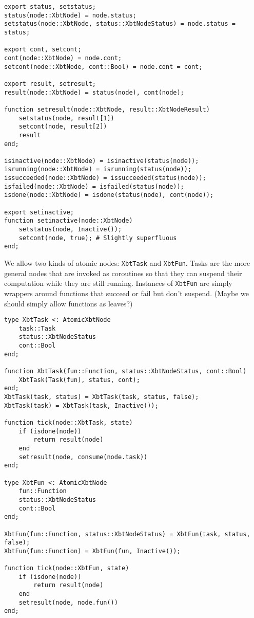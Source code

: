\documentclass[a4wide]{article}
\begin{document}
\begin{verbatim}
export status, setstatus;
status(node::XbtNode) = node.status;
setstatus(node::XbtNode, status::XbtNodeStatus) = node.status = status;

export cont, setcont;
cont(node::XbtNode) = node.cont;
setcont(node::XbtNode, cont::Bool) = node.cont = cont;

export result, setresult;
result(node::XbtNode) = status(node), cont(node);

function setresult(node::XbtNode, result::XbtNodeResult)
    setstatus(node, result[1])
    setcont(node, result[2])
    result
end;

isinactive(node::XbtNode) = isinactive(status(node));
isrunning(node::XbtNode) = isrunning(status(node));
issucceeded(node::XbtNode) = issucceeded(status(node));
isfailed(node::XbtNode) = isfailed(status(node));
isdone(node::XbtNode) = isdone(status(node), cont(node));

export setinactive;
function setinactive(node::XbtNode)
    setstatus(node, Inactive());
    setcont(node, true); # Slightly superfluous
end;
\end{verbatim}

We allow two kinds of atomic nodes: \verb~XbtTask~ and \verb~XbtFun~.  Tasks
are the more general nodes that are invoked as coroutines so that
they can suspend their computation while they are still running.
Instances of \verb~XbtFun~ are simply wrappers around functions that
succeed or fail but don't suspend.  (Maybe we should simply allow
functions as leaves?)

\begin{verbatim}
type XbtTask <: AtomicXbtNode
    task::Task
    status::XbtNodeStatus
    cont::Bool
end;

function XbtTask(fun::Function, status::XbtNodeStatus, cont::Bool)
    XbtTask(Task(fun), status, cont);
end;
XbtTask(task, status) = XbtTask(task, status, false);
XbtTask(task) = XbtTask(task, Inactive());

function tick(node::XbtTask, state)
    if (isdone(node))
        return result(node)
    end
    setresult(node, consume(node.task))
end;

type XbtFun <: AtomicXbtNode
    fun::Function
    status::XbtNodeStatus
    cont::Bool
end;

XbtFun(fun::Function, status::XbtNodeStatus) = XbtFun(task, status, false);
XbtFun(fun::Function) = XbtFun(fun, Inactive());

function tick(node::XbtFun, state)
    if (isdone(node))
        return result(node)
    end
    setresult(node, node.fun())
end;
\end{verbatim}
\end{document}
